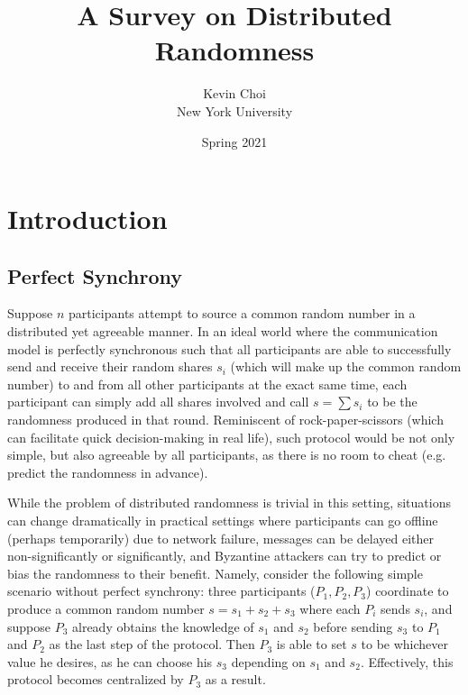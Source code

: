 \documentclass[letterpaper,twocolumn,10pt]{article}
\title{\Large \bf A Survey on Distributed Randomness}
\author{
{\rm Kevin Choi}\\
New York University
}
\date{Spring 2021}
\theoremstyle{definition}
\theoremstyle{remark}
\begin{document}
\maketitle
\pagebreak

\section{Introduction}
\subsection{Perfect Synchrony}
Suppose $n$ participants attempt to source a common random number in a distributed yet agreeable manner. In an ideal world where the communication model is perfectly synchronous such that all participants are able to successfully send and receive their random shares $s_i$ (which will make up the common random number) to and from all other participants at the exact same time, each participant can simply add all shares involved and call $s = \sum s_i$ to be the randomness produced in that round. Reminiscent of rock-paper-scissors (which can facilitate quick decision-making in real life), such protocol would be not only simple, but also agreeable by all participants, as there is no room to cheat (e.g. predict the randomness in advance).

While the problem of distributed randomness is trivial in this setting, situations can change dramatically in practical settings where participants can go offline (perhaps temporarily) due to network failure, messages can be delayed either non-significantly or significantly, and Byzantine attackers can try to predict or bias the randomness to their benefit. Namely, consider the following simple scenario without perfect synchrony: three participants ($P_1, P_2, P_3$) coordinate to produce a common random number $s = s_1 + s_2 + s_3$ where each $P_i$ sends $s_i$, and suppose $P_3$ already obtains the knowledge of $s_1$ and $s_2$ before sending $s_3$ to $P_1$ and $P_2$ as the last step of the protocol. Then $P_3$ is able to set $s$ to be whichever value he desires, as he can choose his $s_3$ depending on $s_1$ and $s_2$. Effectively, this protocol becomes centralized by $P_3$ as a result.
\end{document}
